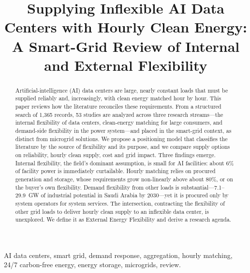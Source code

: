 \documentclass[conference]{IEEEtran}
\begin{document}
\title{Supplying Inflexible AI Data Centers with Hourly Clean Energy: A Smart-Grid Review of Internal and External Flexibility}

\author{
}

\maketitle

\begin{abstract}
Artificial-intelligence (AI) data centers are large, nearly constant loads that must be supplied reliably and, increasingly, with clean energy matched hour by hour. This paper reviews how the literature reconciles these requirements. From a structured search of 1{,}365 records, 53 studies are analyzed across three research streams---the internal flexibility of data centers, clean-energy matching for large consumers, and demand-side flexibility in the power system---and placed in the smart-grid context, as distinct from microgrid solutions. We propose a positioning model that classifies the literature by the source of flexibility and its purpose, and we compare supply options on reliability, hourly clean supply, cost and grid impact. Three findings emerge. Internal flexibility, the field's dominant assumption, is small for AI facilities: about 6\% of facility power is immediately curtailable. Hourly matching relies on procured generation and storage, whose requirements grow non-linearly above about 80\%, or on the buyer's own flexibility. Demand flexibility from other loads is substantial---7.1--29.9~GW of industrial potential in Saudi Arabia by 2030---yet it is procured only by system operators for system services. The intersection, contracting the flexibility of other grid loads to deliver hourly clean supply to an inflexible data center, is unexplored. We define it as External Energy Flexibility and derive a research agenda.
\end{abstract}

\begin{IEEEkeywords}
AI data centers, smart grid, demand response, aggregation, hourly matching, 24/7 carbon-free energy, energy storage, microgrids, review.
\end{IEEEkeywords}
\end{document}
